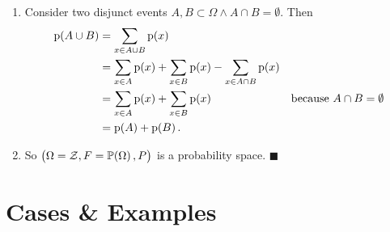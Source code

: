 \documentclass{beamer}
\newcommand{\at}[1]{\ensuremath{\!\del{#1}}}
\newcommand{\fml}[1]{\ensuremath{{\cal #1}}}
\newcommand{\pset}[1]{\ensuremath{\mathbb{P}\at{#1}}}
\newcommand{\pr}[1]{\ensuremath{\mathrm{p}\at{#1}}}
\begin{document}
\begin{frame}
\begin{enumerate}
\begin{enumerate}
            \item Consider two disjunct events $A, B \subset \Omega \land A \cap B = \emptyset$. Then 
            $$
            \begin{aligned}
                \pr{A \cup B} &= \sum_{x \in A \cup B} \pr{x} \cr
                    &= \sum_{x \in A} \pr{x} + \sum_{x \in B} \pr{x} - \sum_{x \in A \cap B} \pr{x}  \cr
                    &= \sum_{x \in A} \pr{x} + \sum_{x \in B} \pr{x} &\text{because}~A\cap B = \emptyset \cr
                    &= \pr{A} + \pr{B}.
            \end{aligned}
            $$
            \item So $\del{\Omega = \fml{Z}, F = \pset{\Omega}, P}$ is a probability space. {$\blacksquare$}
        \end{enumerate}
    \end{enumerate}
    
\end{frame}
\section{Cases \& Examples}
\end{document}
